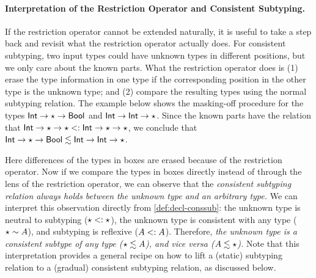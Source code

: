 \paragraph{Interpretation of the Restriction Operator and Consistent Subtyping.}
If the restriction operator cannot be extended naturally, it is useful to
take a step back and revisit what the restriction operator actually does. For
consistent subtyping, two input types could have unknown types in different
positions, but we only care about the known parts. What the restriction
operator does is (1) erase the type information in one type if the corresponding
position in the other type is the unknown type; and (2) compare the resulting types
using the normal subtyping relation. The example below shows the
masking-off procedure for the types $\mathsf{Int} \to \star \to \mathsf{Bool}$ and $\mathsf{Int} \to
\mathsf{Int} \to \star$. Since the known parts have the relation that $\mathsf{Int} \to
\star \to \star <: \mathsf{Int} \to \star \to \star$, we conclude that
$\mathsf{Int} \to \star \to \mathsf{Bool} \lesssim \mathsf{Int} \to \mathsf{Int} \to \star$.
\begin{center}
\end{center}
Here differences of the types in boxes are erased because of the restriction
operator. Now if we compare the types in boxes directly instead of through the
lens of the restriction operator, we can observe that the \textit{consistent
  subtyping relation always holds between the unknown type and an arbitrary
  type.} We can interpret this observation directly from
\cref{def:decl-conssub}: the unknown type is neutral to subtyping ($\star
<: \star$), the unknown type is consistent with any type ($\star \sim
A$), and subtyping is reflexive ($A <: A$). Therefore, \textit{the unknown
  type is a consistent subtype of any type ($\star \lesssim A$), and vice
  versa ($A \lesssim \star$).} Note that this interpretation provides a
general recipe on how to lift a (static) subtyping relation to a (gradual)
consistent subtyping relation, as discussed below.

